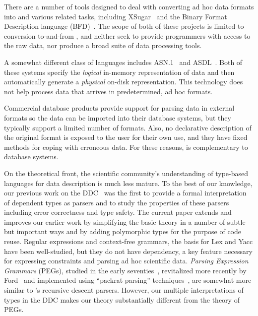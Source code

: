 There are a number of tools designed to deal with converting ad hoc
data formats into \xml{} and various related tasks, including
XSugar~\cite{brabrand+:xsugar2005} and the Binary Format Description
language (BFD)~\cite{bfd}. The scope of both of these projects is
limited to conversion to-and-from \xml{}, and neither seek to provide
programmers with access to the raw data, nor produce a broad suite of
data processing tools.

A somewhat different class of languages includes
\textsc{ASN.1}~\cite{asn} and \textsc{ASDL}~\cite{asdl}.  Both of
these systems specify the {\em logical\/} in-memory representation of
data and then automatically generate a {\em physical\/} on-disk
representation.  This technology does not help process data that
arrives in predetermined, ad hoc formats.


Commercial database products provide support for
parsing data in external formats so the data can be imported into
their database systems, but they typically support a limited number of
formats.  Also, no declarative description of the
original format is exposed to the user for their own use, and they
have fixed methods for coping with erroneous data.  For these reasons,
\padsml{} is complementary to database systems.  

On the theoretical front, the scientific community's understanding of
type-based languages for data description is much less mature.  To the
best of our knowledge, our previous work on the
DDC~\cite{fisher+:next700ddl} was the first to provide a formal
interpretation of dependent types as parsers and to study the
properties of these parsers including error correctness and type
safety.  The current paper extends and improves our earlier work by
simplifying the basic theory in a number of subtle but important ways
and by adding polymorphic types for the purpose of code reuse.
Regular expressions and context-free grammars, the basis for Lex and
Yacc have been well-studied, but they do not have dependency, a key
feature necessary for expressing constraints and parsing ad hoc
scientific data.  {\em Parsing Expression Grammars} (PEGs), studied in
the early seventies~\cite{birman+:parsing}, revitalized more recently
by Ford~\cite{ford:pegs} and implemented using ``packrat parsing''
techniques~\cite{ford:packrat,grimm:packrat}, are somewhat more
similar to \padsml{}'s recursive descent parsers. However, our
multiple interpretations of types in the DDC makes our theory
substantially different from the theory of PEGs.

